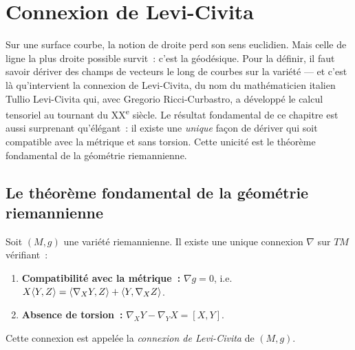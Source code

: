 \chapter{Connexion de Levi-Civita}
\label{ch:levi_civita}

Sur une surface courbe, la notion de \og droite \fg perd son sens euclidien. Mais celle de \og ligne la plus droite possible \fg survit~: c'est la g\'eod\'esique. Pour la d\'efinir, il faut savoir d\'eriver des champs de vecteurs le long de courbes sur la vari\'et\'e --- et c'est l\`a qu'intervient la connexion de Levi-Civita, du nom du math\'ematicien italien Tullio Levi-Civita qui, avec Gregorio Ricci-Curbastro, a d\'evelopp\'e le calcul tensoriel au tournant du XX\textsuperscript{e} si\`ecle. Le r\'esultat fondamental de ce chapitre est aussi surprenant qu'\'el\'egant~: il existe une \emph{unique} fa\c{c}on de d\'eriver qui soit compatible avec la m\'etrique et sans torsion. Cette unicit\'e est le th\'eor\`eme fondamental de la g\'eom\'etrie riemannienne.

\section{Le th\'eor\`eme fondamental de la g\'eom\'etrie riemannienne}

\begin{theoreme}
\label{thm:levi_civita}
Soit $(M, g)$ une vari\'et\'e riemannienne. Il existe une unique connexion $\nabla$
sur $TM$ v\'erifiant~:
\begin{enumerate}
    \item \textbf{Compatibilit\'e avec la m\'etrique~:} $\nabla g = 0$, i.e.\
    $X\langle Y, Z \rangle = \langle \nabla_X Y, Z \rangle + \langle Y, \nabla_X Z \rangle$.
    \item \textbf{Absence de torsion~:} $\nabla_X Y - \nabla_Y X = [X, Y]$.
\end{enumerate}
Cette connexion est appel\'ee la \emph{connexion de Levi-Civita} de $(M, g)$.
\end{theoreme}


